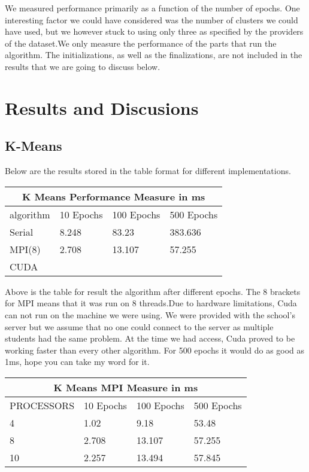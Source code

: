 \begin{multicols*}{2}
    We measured performance primarily as a function of the number of epochs. One interesting factor we could have considered was the number of clusters we could have used, but we however stuck to using only three as specified by the providers of the dataset.We only measure the performance of the parts that run the algorithm. The initializations, as well as the finalizations, are not included in the results that we are going to discuss below.


    \section{Results and Discusions}
    \subsection{K-Means}
    Below are the results stored in the table format for different implementations.
    

    \begin{tabular}{ |p{2cm}||p{1.2cm}|p{1.2cm}|p{1.2cm}|  }
        \hline
        \multicolumn{4}{|c|}{K Means Performance Measure in ms} \\
        \hline
        algorithm& 10 Epochs &100 Epochs&500 Epochs\\
        \hline
        Serial  &  8.248    &    83.23   &  383.636 \\
        MPI(8)     &   2.708    &    13.107   & 57.255  \\
        CUDA    &       &       &   \\
        \hline
    \end{tabular}

    Above is the table for result the algorithm after different epochs. The $8$ brackets for MPI means that it was run on $8$ threads.Due to hardware limitations, Cuda can not run on the machine we were using. We were provided with the school's server but we assume that no one could connect to the server as multiple students had the same problem.  At the time we had access, Cuda proved to be working faster than every other algorithm. For 500 epochs it would do as good as 1ms, hope you can take my word for it.  

    \begin{tabular}{ |p{2cm}||p{1.2cm}|p{1.2cm}|p{1.2cm}|  }
        \hline
        \multicolumn{4}{|c|}{K Means MPI Measure in ms} \\
        \hline
        PROCESSORS & 10 Epochs &100 Epochs&500 Epochs\\
        \hline
        4  &  1.02   &    9.18   &   53.48 \\    
        8    &   2.708    &    13.107   & 57.255  \\
        10    &   2.257    &    13.494   &   57.845\\    
        \hline
    \end{tabular}


\end{multicols*}
